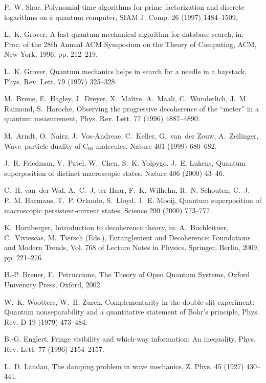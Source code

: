 \documentclass[3p,sort&compress]{elsarticle}
\begin{document}
\begin{thebibliography}{100}
P.~W. Shor, Polynomial-time algorithms for prime factorization and discrete
  logarithms on a quantum computer, SIAM J. Comp. 26 (1997) 1484--1509.

L.~K. Grover, A fast quantum mechanical algorithm for database search, in:
  Proc. of the 28th Annual ACM Symposium on the Theory of Computing, ACM, New
  York, 1996, pp. 212--219.

L.~K. Grover, Quantum mechanics helps in search for a needle in a haystack,
  Phys. Rev. Lett. 79 (1997) 325--328.

M.~Brune, E.~Hagley, J.~Dreyer, X.~Ma{\^i}tre, A.~Maali, C.~Wunderlich, J.~M.
  Raimond, S.~Haroche, Observing the progressive decoherence of the ``meter''
  in a quantum measurement, Phys. Rev. Lett. 77 (1996) 4887--4890.

M.~Arndt, O.~Nairz, J.~Vos-Andreae, C.~Keller, G.~van~der Zouw, A.~Zeilinger,
  Wave--particle duality of {C$_{60}$} molecules, Nature 401 (1999) 680--682.

J.~R. Friedman, V.~Patel, W.~Chen, S.~K. Yolpygo, J.~E. Lukens, Quantum
  superposition of distinct macroscopic states, Nature 406 (2000) 43--46.

C.~H. van~der Wal, A.~C.~J. ter Haar, F.~K. Wilhelm, R.~N. Schouten, C.~J.
  P.~M. Harmans, T.~P. Orlando, S.~Lloyd, J.~E. Mooij, Quantum superposition of
  macroscopic persistent-current states, Science 290 (2000) 773--777.

K.~Hornberger, Introduction to decoherence theory, in: A.~Buchleitner,
  C.~Viviescas, M.~Tiersch (Eds.), Entanglement and Decoherence: Foundations
  and Modern Trends, Vol. 768 of Lecture Notes in Physics, Springer, Berlin,
  2009, pp. 221--276.

H.-P. Breuer, F.~Petruccione, The Theory of Open Quantum Systems, Oxford
  University Press, Oxford, 2002.

W.~K. Wootters, W.~H. Zurek, Complementarity in the double-slit experiment:
  {Q}uantum nonseparability and a quantitative statement of {B}ohr's principle,
  Phys. Rev. D 19 (1979) 473--484.

B.-G. Englert, Fringe visibility and which-way information: An inequality,
  Phys. Rev. Lett. 77 (1996) 2154--2157.

L.~D. Landau, The damping problem in wave mechanics, Z. Phys. 45 (1927)
  430--441.


\end{thebibliography}
\end{document}
